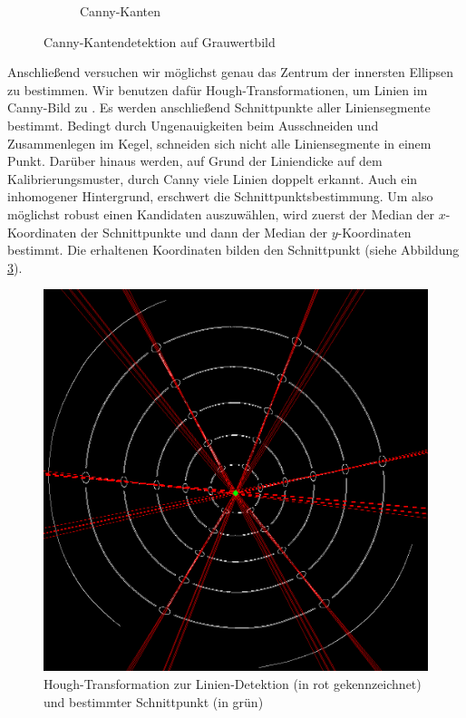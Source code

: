 \begin{figure}[!htb]
\begin{subfigure}{.5\textwidth}
		\caption{Canny-Kanten}
		\label{fig:afterCanny}
	\end{subfigure}
	\caption{Canny-Kantendetektion auf Grauwertbild}
	\label{fig:canny}
\end{figure}

Anschließend versuchen wir möglichst genau das Zentrum der innersten Ellipsen zu bestimmen.
Wir benutzen dafür Hough-Transformationen, um Linien im Canny-Bild zu .
Es werden anschließend Schnittpunkte aller Liniensegmente bestimmt. Bedingt durch Ungenauigkeiten beim Ausschneiden und Zusammenlegen im Kegel, schneiden sich nicht alle Liniensegmente in einem Punkt.
Darüber hinaus werden, auf Grund der Liniendicke auf dem Kalibrierungsmuster, durch Canny viele Linien doppelt erkannt. Auch ein inhomogener Hintergrund, erschwert die Schnittpunktsbestimmung. Um also möglichst robust einen Kandidaten auszuwählen, wird zuerst der Median der $x$-Koordinaten der Schnittpunkte und dann der Median der $y$-Koordinaten bestimmt. Die erhaltenen Koordinaten bilden den Schnittpunkt (siehe Abbildung \ref{fig:houghLines}).

\begin{figure}[!htb]
	\centering
	\includegraphics[scale=.25]{images/houghLines.png}
	\caption{Hough-Transformation zur Linien-Detektion (in rot gekennzeichnet) und bestimmter Schnittpunkt (in grün) }
	\label{fig:houghLines}
\end{figure}


